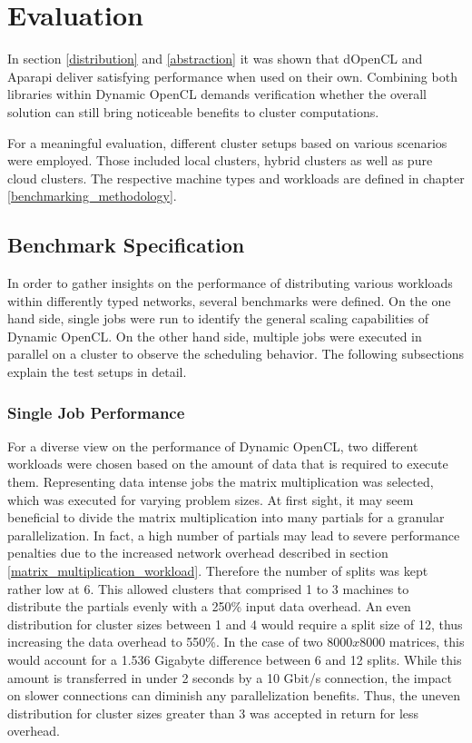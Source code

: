 \chapter{Evaluation}
\label{evaluation}
In section \ref{distribution} and \ref{abstraction} it was shown that dOpenCL and Aparapi deliver satisfying performance when used on their own. Combining both libraries within Dynamic OpenCL demands verification whether the overall solution can still bring noticeable benefits to cluster computations.

For a meaningful evaluation, different cluster setups based on various scenarios were employed. Those included local clusters, hybrid clusters as well as pure cloud clusters. The respective machine types and workloads are defined in chapter \ref{benchmarking_methodology}.

\section{Benchmark Specification}

In order to gather insights on the performance of distributing various workloads within differently typed networks, several benchmarks were defined. On the one hand side, single jobs were run to identify the general scaling capabilities of Dynamic OpenCL. On the other hand side, multiple jobs were executed in parallel on a cluster to observe the scheduling behavior. The following subsections explain the test setups in detail.

\subsection{Single Job Performance}

For a diverse view on the performance of Dynamic OpenCL, two different workloads were chosen based on the amount of data that is required to execute them. Representing data intense jobs the matrix multiplication was selected, which was executed for varying problem sizes. At first sight, it may seem beneficial to divide the matrix multiplication into many partials for a granular parallelization. In fact, a high number of partials may lead to severe performance penalties due to the increased network overhead described in section \ref{matrix_multiplication_workload}. Therefore the number of splits was kept rather low at 6. This allowed clusters that comprised 1 to 3 machines to distribute the partials evenly with a 250\% input data overhead. An even distribution for cluster sizes between 1 and 4 would require a split size of 12, thus increasing the data overhead to 550\%. In the case of two $8000x8000$ matrices, this would account for a 1.536 Gigabyte difference between 6 and 12 splits. While this amount is transferred in under 2 seconds by a 10 Gbit/s connection, the impact on slower connections can diminish any parallelization benefits. Thus, the uneven distribution for cluster sizes greater than 3 was accepted in return for less overhead.

